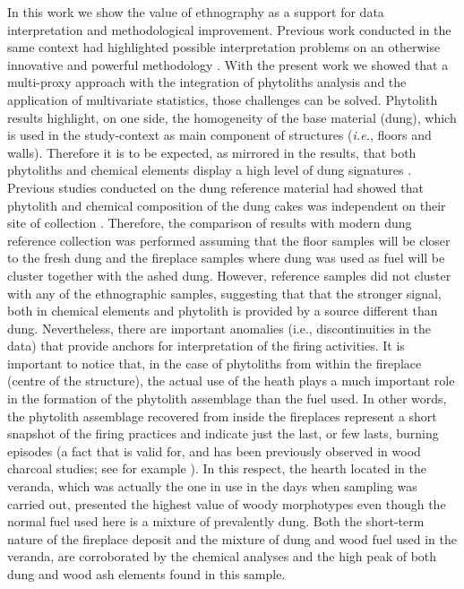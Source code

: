 \documentclass[authoryear,preprint,review,12pt]{elsarticle}
\begin{document}
In this work we show the value of ethnography as a support for data interpretation and methodological improvement. Previous work conducted in the same context had highlighted possible interpretation problems on an otherwise innovative and powerful methodology \citep{Rondelli2014}. With the present work we showed that a multi-proxy approach with the integration of phytoliths analysis and the application of multivariate statistics, those challenges can be solved. Phytolith results highlight, on one side, the homogeneity of the base material (dung), which is used in the study-context as main component of structures (\emph{i.e.}, floors and walls). Therefore it is to be expected, as mirrored in the results, that both phytoliths and chemical elements display a high level of dung signatures \citep{Lancelotti2012}. Previous studies conducted on the dung reference material had showed that phytolith and chemical composition of the dung cakes was independent on their site of collection \citep{Lancelotti2012}. Therefore, the comparison of results with modern dung reference collection was performed assuming that the floor samples will be closer to the fresh dung and the fireplace samples where dung was used as fuel will be cluster together with the ashed dung. However, reference samples did not cluster with any of the ethnographic samples, suggesting that that the stronger signal, both in chemical elements and phytolith is provided by a source different than dung. Nevertheless, there are important anomalies (i.e., discontinuities in the data) that provide anchors for interpretation of the firing activities. It is important to notice that, in the case of phytoliths from within the fireplace (centre of the structure), the actual use of the heath plays a much important role in the formation of the phytolith assemblage than the fuel used. In other words, the phytolith assemblage recovered from inside the fireplaces represent a short snapshot of the firing practices and indicate just the last, or few lasts, burning episodes (a fact that is valid for, and has been previously observed in wood charcoal studies; see for example \citealt{Chabal1997}). In this respect, the hearth located in the veranda, which was actually the one in use in the days when sampling was carried out, presented the highest value of woody morphotypes even though the normal fuel used here is a mixture of prevalently dung. Both the short-term nature of the fireplace deposit and the mixture of dung and wood fuel used in the veranda, are corroborated by the chemical analyses and the high peak of both dung and wood ash elements found in this sample.\par
\end{document}
